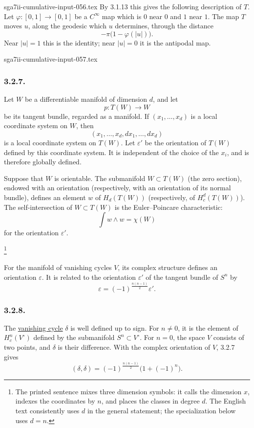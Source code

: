 \begin{filecontents*}{sga7ii-cumulative-input-056.tex}
By 3.1.13 this gives the following description of $T$.  Let
$\varphi:[0,1]\to[0,1]$ be a $C^\infty$ map which is $0$ near $0$ and
$1$ near $1$.  The map $T$ moves $u$, along the geodesic which $u$
determines, through the distance
\[
-\pi\bigl(1-\varphi(|u|)\bigr).
\]
Near $|u|=1$ this is the identity; near $|u|=0$ it is the antipodal
map.
\end{filecontents*}
\begin{filecontents*}{sga7ii-cumulative-input-057.tex}
\subsubsection*{3.2.7.}
Let $W$ be a differentiable manifold of dimension $d$, and let
\[
p:T(W)\longrightarrow W
\]
be its tangent bundle, regarded as a manifold.  If
$(x_1,\ldots,x_d)$ is a local coordinate system on $W$, then
\[
(x_1,\ldots,x_d,dx_1,\ldots,dx_d)
\]
is a local coordinate system on $T(W)$.  Let $\varepsilon'$ be the
orientation of $T(W)$ defined by this coordinate system.  It is
independent of the choice of the $x_i$, and is therefore globally
defined.

Suppose that $W$ is orientable.  The submanifold $W\subset T(W)$ (the
zero section), endowed with an orientation (respectively, with an
orientation of its normal bundle), defines an element $w$ of
$H_d(T(W))$ (respectively, of $H_c^d(T(W))$).  The self-intersection
of $W\subset T(W)$ is the Euler--Poincare characteristic:
\[
\int w\wedge w=\chi(W)
\]
for the orientation $\varepsilon'$.

\footnote{The printed sentence mixes three dimension symbols: it calls
the dimension $x$, indexes the coordinates by $n$, and places the
classes in degree $d$.  The English text consistently uses $d$ in the
general statement; the specialization below uses $d=n$.}

For the manifold of vanishing cycles $V$, its complex structure
defines an orientation $\varepsilon$.  It is related to the
orientation $\varepsilon'$ of the tangent bundle of $S^n$ by
\[
\varepsilon=(-1)^{\frac{n(n-1)}2}\varepsilon'.
\]

\subsubsection*{3.2.8.}
The \underline{vanishing cycle} $\delta$ is well defined up to sign.
For $n\ne0$, it is the element of $H_c^n(V^\circ)$ defined by the
submanifold $S^n\subset V^\circ$.  For $n=0$, the space $V$ consists
of two points, and $\delta$ is their difference.  With the complex
orientation of $V$, 3.2.7 gives
\begin{equation}\tag{3.2.8.1}
(\delta,\delta)
=(-1)^{\frac{n(n-1)}2}\bigl(1+(-1)^n\bigr).
\end{equation}


\end{filecontents*}
